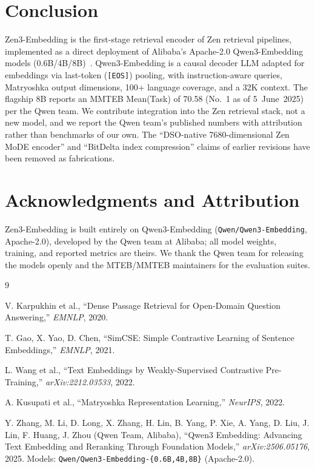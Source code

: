 \documentclass[11pt,a4paper]{article}
\begin{document}
\section{Conclusion}
\label{sec:conclusion}

Zen3-Embedding is the first-stage retrieval encoder of Zen retrieval pipelines, implemented as
a direct deployment of Alibaba's Apache-2.0 Qwen3-Embedding models
(0.6B/4B/8B)~\cite{qwen3embedding}. Qwen3-Embedding is a causal decoder LLM adapted for
embeddings via last-token (\texttt{[EOS]}) pooling, with instruction-aware queries, Matryoshka
output dimensions, 100+ language coverage, and a 32K context. The flagship 8B reports an MMTEB
Mean(Task) of 70.58 (No.~1 as of 5~June~2025) per the Qwen team. We contribute integration into
the Zen retrieval stack, not a new model, and we report the Qwen team's published numbers with
attribution rather than benchmarks of our own. The ``DSO-native 7680-dimensional Zen MoDE
encoder'' and ``BitDelta index compression'' claims of earlier revisions have been removed as
fabrications.

\section*{Acknowledgments and Attribution}

Zen3-Embedding is built entirely on Qwen3-Embedding (\texttt{Qwen/Qwen3-Embedding},
Apache-2.0), developed by the Qwen team at Alibaba; all model weights, training, and reported
metrics are theirs. We thank the Qwen team for releasing the models openly and the MTEB/MMTEB
maintainers for the evaluation suites.


\begin{thebibliography}{9}

V. Karpukhin et al.,
``Dense Passage Retrieval for Open-Domain Question Answering,''
\textit{EMNLP}, 2020.

T. Gao, X. Yao, D. Chen,
``SimCSE: Simple Contrastive Learning of Sentence Embeddings,''
\textit{EMNLP}, 2021.

L. Wang et al.,
``Text Embeddings by Weakly-Supervised Contrastive Pre-Training,''
\textit{arXiv:2212.03533}, 2022.

A. Kusupati et al.,
``Matryoshka Representation Learning,''
\textit{NeurIPS}, 2022.

Y. Zhang, M. Li, D. Long, X. Zhang, H. Lin, B. Yang, P. Xie, A. Yang, D. Liu, J. Lin,
F. Huang, J. Zhou (Qwen Team, Alibaba),
``Qwen3 Embedding: Advancing Text Embedding and Reranking Through Foundation Models,''
\textit{arXiv:2506.05176}, 2025.
Models: \texttt{Qwen/Qwen3-Embedding-\{0.6B,4B,8B\}} (Apache-2.0).

\end{thebibliography}
\end{document}
